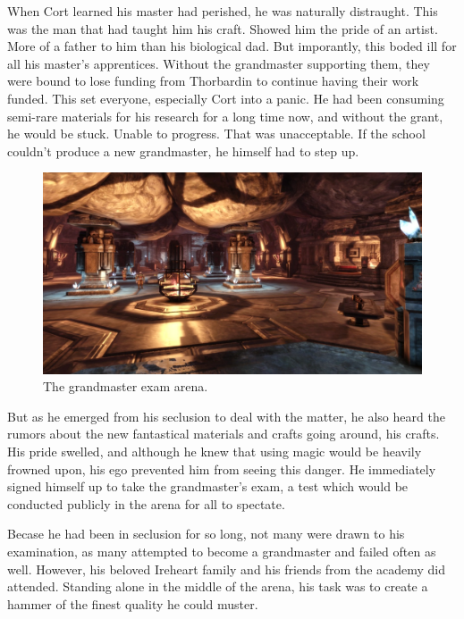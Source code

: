 \documentclass[12pt]{article}
\begin{document}
When Cort learned his master had perished, he was naturally distraught. This was
the man that had taught him his craft. Showed him the pride of an artist. More
of a father to him than his biological dad. But imporantly, this boded ill for
all his master's apprentices. Without the grandmaster supporting them, they were
bound to lose funding from Thorbardin to continue having their work funded. This
set everyone, especially Cort into a panic. He had been consuming semi-rare
materials for his research for a long time now, and without the grant, he would
be stuck. Unable to progress. That was unacceptable. If the school couldn't
produce a new grandmaster, he himself had to step up.

\begin{figure}[H]
  \centering
  \includegraphics[width=\textwidth]{./resources/arena}
  \caption{The grandmaster exam arena.}
\end{figure}

But as he emerged from his seclusion to deal with the matter, he also heard the
rumors about the new fantastical materials and crafts going around, his crafts.
His pride swelled, and although he knew that using magic would be heavily
frowned upon, his ego prevented him from seeing this danger. He immediately
signed himself up to take the grandmaster's exam, a test which would be
conducted publicly in the arena for all to spectate.

Becase he had been in seclusion for so long, not many were drawn to his
examination, as many attempted to become a grandmaster and failed often as well.
However, his beloved Ireheart family and his friends from the academy did
attended. Standing alone in the middle of the arena, his task was to create
a hammer of the finest quality he could muster.
\end{document}
